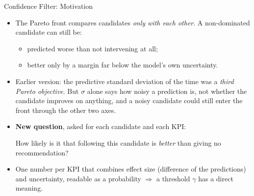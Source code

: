 \documentclass[aspectratio=169]{beamer} %
\begin{document}
\begin{frame}{Confidence Filter: Motivation}
  \small
  \begin{itemize}
    \item The Pareto front compares candidates \emph{only with each other}. A
      non-dominated candidate can still be:
      \begin{itemize}
        \item predicted \alert{worse than not intervening} at all;
        \item better only by a margin far \alert{below the model's own uncertainty}.
      \end{itemize}
    \item Earlier version: the predictive standard deviation of the time was a
      \emph{third Pareto objective}. But $\sigma$ alone says how noisy a prediction
      is, not whether the candidate improves on anything, and a noisy candidate
      could still enter the front through the other two axes.
    \item \textbf{New question}, asked for each candidate and each KPI:
      \begin{block}{}
        \centering
        How likely is it that following this candidate is \emph{better} than giving
        no recommendation?
      \end{block}
    \item One number per KPI that combines \alert{effect size} (difference of the
      predictions) and \alert{uncertainty}, readable as a probability
      $\Rightarrow$ a threshold $\gamma$ has a direct meaning.
  \end{itemize}
\end{frame}
\end{document}
